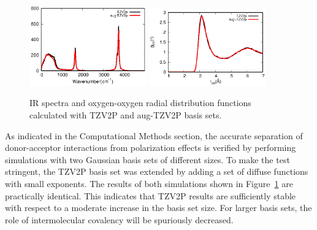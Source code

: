 \documentclass[journal=jacsat,manuscript=article]{achemso}
\begin{document}
\begin{figure}
\includegraphics[width=0.45\textwidth]{basis_ir}
\includegraphics[width=0.45\textwidth]{basis_rdf}
\caption{IR spectra and oxygen-oxygen radial distribution functions calculated with TZV2P and aug-TZV2P basis sets.}\label{Fig:basis}
\end{figure} 

As indicated in the Computational Methods section, the accurate separation of donor-acceptor interactions from polarization effects is verified by performing simulations with two Gaussian basis sets of different sizes. 
To make the test stringent, the TZV2P basis set was extended by adding a set of diffuse functions with small exponents. 
The results of both simulations shown in Figure~\ref{Fig:basis} are practically identical. 
This indicates that TZV2P results are sufficiently stable with respect to a moderate increase in the basis set size. 
For larger basis sets, the role of intermolecular covalency will be spuriously decreased.


\end{document}
